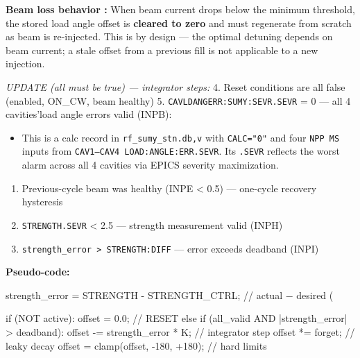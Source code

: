 \begin{keynote}
\textbf{Beam loss behavior :} When beam current drops below the minimum threshold, the stored load angle offset is \textbf{cleared to zero} and must regenerate from scratch as beam is re-injected. This is by design --- the optimal detuning depends on beam current; a stale offset from a previous fill is not applicable to a new injection.
\end{keynote}

\emph{UPDATE (all must be true) --- integrator steps:}
4. Reset conditions are all false (enabled, ON\_CW, beam healthy)
5. \texttt{CAVLDANGERR:\allowbreak{}SUMY:\allowbreak{}SEVR.\allowbreak{}SEVR} = 0 --- all 4 cavities'load angle errors valid (INPB):

\begin{itemize}
\tightlist
\item
  This is a calc record in \texttt{rf\_\allowbreak{}sumy\_\allowbreak{}stn.\allowbreak{}db,\allowbreak{}v} with \texttt{CALC="0"} and four \texttt{NPP\ MS} inputs from \texttt{CAV1–CAV4\ LOAD:\allowbreak{}ANGLE:\allowbreak{}ERR.\allowbreak{}SEVR}. Its \texttt{.SEVR} reflects the worst alarm across all 4 cavities via EPICS severity maximization.
\end{itemize}

\begin{enumerate}
\def\labelenumi{\arabic{enumi}.}
\setcounter{enumi}{5}
\tightlist
\item
  Previous-cycle beam was healthy (INPE \textless{} 0.5) --- one-cycle recovery hysteresis
\item
  \texttt{STRENGTH.SEVR} \textless{} 2.5 --- strength measurement valid (INPH)
\item
  \texttt{\textbar{}strength\_\allowbreak{}error\textbar{}\ \textgreater{}\ STRENGTH:\allowbreak{}DIFF} --- error exceeds deadband (INPI)
\end{enumerate}

\textbf{Pseudo-code:}

\begin{codeblock}
strength_error = STRENGTH - STRENGTH_CTRL;   // actual − desired (%

if (NOT active):
    offset = 0.0;                             // RESET
else if (all_valid AND |strength_error| > deadband):
    offset -= strength_error * K;             // integrator step
offset *= forget;                             // leaky decay
offset = clamp(offset, -180, +180);           // hard limits
\end{codeblock}

